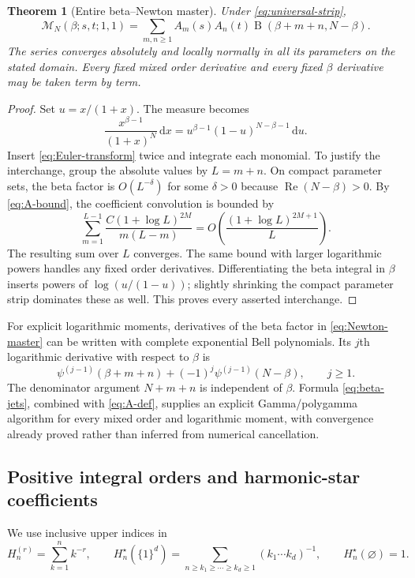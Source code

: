 \documentclass[11pt]{article}
\numberwithin{equation}{section}
\newtheorem{theorem}{Theorem}[section]
\theoremstyle{definition}
\DeclareMathOperator{\Rea}{Re}
\DeclareMathOperator{\B}{B}
\newcommand{\dd}{\,\mathrm d}
\newcommand{\MM}{\mathcal M}
\begin{document}
\begin{theorem}[Entire beta--Newton master]\label{thm:Newton-master}
Under \eqref{eq:universal-strip},
\begin{equation}\label{eq:Newton-master}
 \boxed{\displaystyle
 \MM_N(\beta;s,t;1,1)=
 \sum_{m,n\ge1}A_m(s)A_n(t)\B(\beta+m+n,N-\beta).}
\end{equation}
The series converges absolutely and locally normally in all its parameters on the stated domain. Every fixed mixed order derivative and every fixed $\beta$ derivative may be taken term by term.
\end{theorem}
\begin{proof}
Set $u=x/(1+x)$. The measure becomes
\[
 \frac{x^{\beta-1}}{(1+x)^N}\dd x
 =u^{\beta-1}(1-u)^{N-\beta-1}\dd u.
\]
Insert \eqref{eq:Euler-transform} twice and integrate each monomial. To justify the interchange, group the absolute values by $L=m+n$. On compact parameter sets, the beta factor is $O(L^{-\delta})$ for some $\delta>0$ because $\Rea(N-\beta)>0$. By \eqref{eq:A-bound}, the coefficient convolution is bounded by
\[
 \sum_{m=1}^{L-1}\frac{C(1+\log L)^{2M}}{m(L-m)}
 =O\!\left(\frac{(1+\log L)^{2M+1}}L\right).
\]
The resulting sum over $L$ converges. The same bound with larger logarithmic powers handles any fixed order derivatives. Differentiating the beta integral in $\beta$ inserts powers of $\log(u/(1-u))$; slightly shrinking the compact parameter strip dominates these as well. This proves every asserted interchange.
\end{proof}

For explicit logarithmic moments, derivatives of the beta factor in \eqref{eq:Newton-master} can be written with complete exponential Bell polynomials. Its $j$th logarithmic derivative with respect to $\beta$ is
\begin{equation}\label{eq:beta-jets}
 \psi^{(j-1)}(\beta+m+n)+(-1)^j\psi^{(j-1)}(N-\beta),\qquad j\ge1.
\end{equation}
The denominator argument $N+m+n$ is independent of $\beta$. Formula \eqref{eq:beta-jets}, combined with \eqref{eq:A-def}, supplies an explicit Gamma/polygamma algorithm for every mixed order and logarithmic moment, with convergence already proved rather than inferred from numerical cancellation.

\subsection{Positive integral orders and harmonic-star coefficients}
We use inclusive upper indices in
\[
 H_n^{(r)}=\sum_{k=1}^n k^{-r},\qquad
 H_n^\star(\{1\}^{d})=
 \sum_{n\ge k_1\ge\cdots\ge k_d\ge1}(k_1\cdots k_d)^{-1},
 \qquad H_n^\star(\varnothing)=1.
\]
\end{document}

